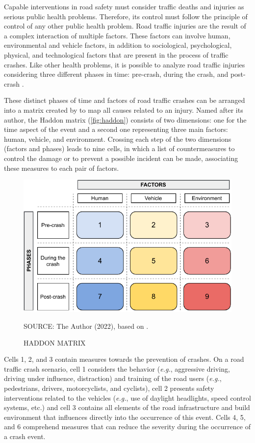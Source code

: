 Capable interventions in road safety must consider traffic deaths and injuries as serious public health problems. Therefore, its control must follow the principle of control of any other public health problem. Road traffic injuries are the result of a complex interaction of multiple factors. These factors can involve human, environmental and vehicle factors, in addition to sociological, psychological, physical, and technological factors that are present in the process of traffic crashes. Like other health problems, it is possible to analyze road traffic injuries considering three different phases in time: pre-crash, during the crash, and post-crash \cite{Mohan2016}.

These distinct phases of time and factors of road traffic crashes can be arranged into a matrix created by \textcite{Haddon1980} to map all causes related to an injury. Named after its author, the Haddon matrix (\autoref{fig:haddon}) consists of two dimensions: one for the time aspect of the event and a second one representing three main factors: human, vehicle, and environment. Crossing each step of the two dimensions (factors and phases) leads to nine cells, in which a list of countermeasures to control the damage or to prevent a possible incident can be made, associating these measures to each pair of factors. 

\begin{figure}[!htbp]
    \centering\footnotesize
    \captionsetup{font=footnotesize}
    \caption{HADDON MATRIX}
    \includegraphics{fig/haddon.pdf}
    \label{fig:haddon}
    \par SOURCE: The Author (2022), based on \textcite{Haddon1980}.
\end{figure} 

Cells 1, 2, and 3 contain measures towards the prevention of crashes. On a road traffic crash scenario, cell 1 considers the behavior (\textit{e.g.}, aggressive driving, driving under influence, distraction) and training of the road users (\textit{e.g.}, pedestrians, drivers, motorcyclists, and cyclists), cell 2 presents safety interventions related to the vehicles (\textit{e.g.}, use of daylight headlights, speed control systems, etc.) and cell 3 contains all elements of the road infrastructure and build environment that influences directly into the occurrence of this event. Cells 4, 5, and 6 comprehend measures that can reduce the severity during the occurrence of a crash event.


